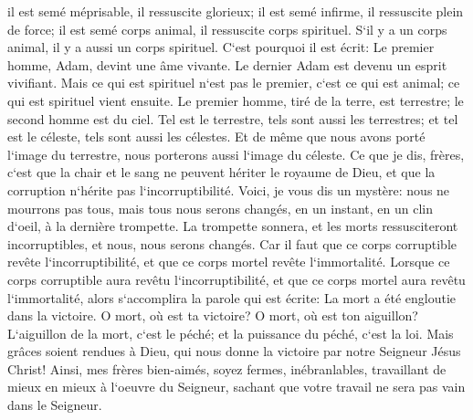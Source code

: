 \verse il est semé méprisable, il ressuscite glorieux; il est semé infirme, il ressuscite plein de force; 
\verse il est semé corps animal, il ressuscite corps spirituel. S`il y a un corps animal, il y a aussi un corps spirituel. 
\verse C`est pourquoi il est écrit: Le premier homme, Adam, devint une âme vivante. Le dernier Adam est devenu un esprit vivifiant. 
\verse Mais ce qui est spirituel n`est pas le premier, c`est ce qui est animal; ce qui est spirituel vient ensuite. 
\verse Le premier homme, tiré de la terre, est terrestre; le second homme est du ciel. 
\verse Tel est le terrestre, tels sont aussi les terrestres; et tel est le céleste, tels sont aussi les célestes. 
\verse Et de même que nous avons porté l`image du terrestre, nous porterons aussi l`image du céleste. 
\verse Ce que je dis, frères, c`est que la chair et le sang ne peuvent hériter le royaume de Dieu, et que la corruption n`hérite pas l`incorruptibilité. 
\verse Voici, je vous dis un mystère: nous ne mourrons pas tous, mais tous nous serons changés, 
\verse en un instant, en un clin d`oeil, à la dernière trompette. La trompette sonnera, et les morts ressusciteront incorruptibles, et nous, nous serons changés. 
\verse Car il faut que ce corps corruptible revête l`incorruptibilité, et que ce corps mortel revête l`immortalité. 
\verse Lorsque ce corps corruptible aura revêtu l`incorruptibilité, et que ce corps mortel aura revêtu l`immortalité, alors s`accomplira la parole qui est écrite: La mort a été engloutie dans la victoire. 
\verse O mort, où est ta victoire? O mort, où est ton aiguillon? 
\verse L`aiguillon de la mort, c`est le péché; et la puissance du péché, c`est la loi. 
\verse Mais grâces soient rendues à Dieu, qui nous donne la victoire par notre Seigneur Jésus Christ! 
\verse Ainsi, mes frères bien-aimés, soyez fermes, inébranlables, travaillant de mieux en mieux à l`oeuvre du Seigneur, sachant que votre travail ne sera pas vain dans le Seigneur. 

\chapter{}

